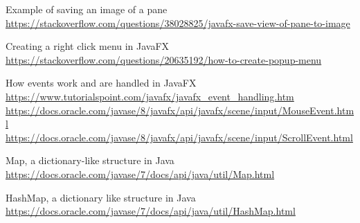 \documentclass[../../main.tex]{subfiles}
\begin{document}
\begin{thebibliography}{9}
Example of saving an image of a pane\\
\url{https://stackoverflow.com/questions/38028825/javafx-save-view-of-pane-to-image}

Creating a right click menu in JavaFX\\
\url{https://stackoverflow.com/questions/20635192/how-to-create-popup-menu}

How events work and are handled in JavaFX\\
\url{https://www.tutorialspoint.com/javafx/javafx_event_handling.htm}\\
\url{https://docs.oracle.com/javase/8/javafx/api/javafx/scene/input/MouseEvent.html}\\
\url{https://docs.oracle.com/javase/8/javafx/api/javafx/scene/input/ScrollEvent.html}

Map, a dictionary-like structure in Java\\
\url{https://docs.oracle.com/javase/7/docs/api/java/util/Map.html}

HashMap, a dictionary like structure in Java\\
\url{https://docs.oracle.com/javase/7/docs/api/java/util/HashMap.html}
\end{thebibliography}
\end{document}
